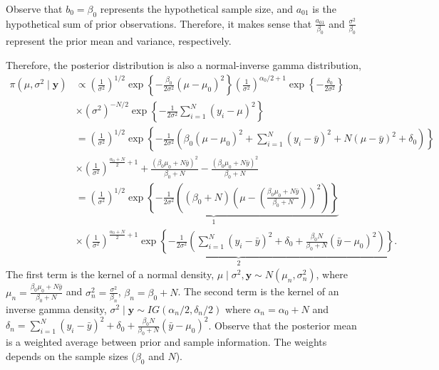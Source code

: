 \begin{enumerate}
Observe that \( b_0 = \beta_0 \) represents the hypothetical sample size, and \( a_{01} \) is the hypothetical sum of prior observations. Therefore, it makes sense that \( \frac{a_{01}}{\beta_0} \) and \( \frac{\sigma^2}{\beta_0} \) represent the prior mean and variance, respectively.

Therefore, the posterior distribution is also a normal-inverse gamma distribution,
{\footnotesize{
\begin{align}
	\pi(\mu,\sigma^2\mid \bm{y})&\propto \left(\frac{1}{\sigma^2}\right)^{1/2}\exp\left\{-\frac{\beta_0}{2\sigma^2}(\mu-\mu_0)^2\right\}\left(\frac{1}{\sigma^2}\right)^{\alpha_0/2+1}\exp\left\{-\frac{\delta_0}{2\sigma^2}\right\}\nonumber\\
	&\times(\sigma^2)^{-N/2}\exp\left\{-\frac{1}{2\sigma^2}\sum_{i=1}^N (y_i-\mu)^2\right\}\nonumber\\
	& = \left(\frac{1}{\sigma^2}\right)^{1/2}\exp\left\{-\frac{1}{2\sigma^2}\left(\beta_0(\mu-\mu_0)^2+\sum_{i=1}^N (y_i-\bar{y})^2+N(\mu-\bar{y})^2+\delta_0\right)\right\}\nonumber\\
	& \times\left(\frac{1}{\sigma^2}\right)^{\frac{\alpha_0+N}{2}+1} + \frac{(\beta_0\mu_0+N\bar{y})^2}{\beta_0+N} - \frac{(\beta_0\mu_0+N\bar{y})^2}{\beta_0+N}\nonumber\\
	& = \underbrace{\left(\frac{1}{\sigma^2}\right)^{1/2}\exp\left\{-\frac{1}{2\sigma^2}\left((\beta_0+N)\left(\mu-\left(\frac{\beta_0\mu_0+N\bar{y}}{\beta_0+N}\right)\right)^2\right)\right\}}_{1}\nonumber\\
	& \times \underbrace{\left(\frac{1}{\sigma^2}\right)^{\frac{\alpha_0+N}{2}+1}\exp\left\{-\frac{1}{2\sigma^2}\left(\sum_{i=1}^N (y_i-\bar{y})^2+\delta_0+\frac{\beta_0N}{\beta_0+N}(\bar{y}-\mu_0)^2\right)\right\}}_{2}.\nonumber
\end{align}
}}
The first term is the kernel of a normal density, $\mu\mid \sigma^2,\bm{y}\sim N \left(\mu_n, \sigma_n^2\right)$, where $\mu_n=\frac{\beta_0\mu_0+N\bar{y}}{\beta_0+N}$ and $\sigma_n^2=\frac{\sigma^2}{\beta_n}$, $\beta_n=\beta_0+N$. The second term is the kernel of an inverse gamma density, $\sigma^2\mid \bm{y}\sim IG(\alpha_n/2,\delta_n/2)$ where $\alpha_n=\alpha_0+N$ and $\delta_n=\sum_{i=1}^N (y_i-\bar{y})^2+\delta_0+\frac{\beta_0N}{\beta_0+N}(\bar{y}-\mu_0)^2$. Observe that the posterior mean is a weighted average between prior and sample information. The weights depends on the sample sizes ($\beta_0$ and $N$).


\end{enumerate}
